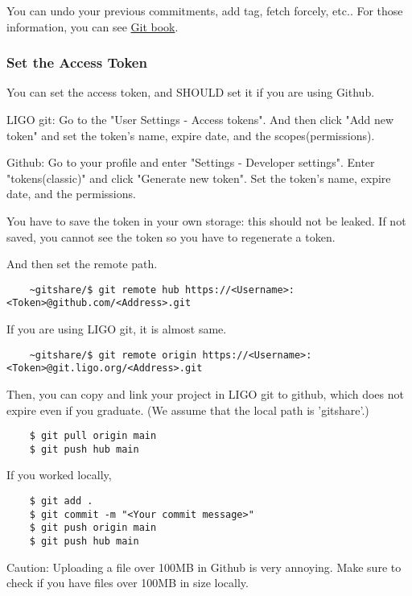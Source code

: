 You can undo your previous commitments, add tag, fetch forcely, etc.. For those information, you can see \href{https://git-scm.com/book/en/v2}{Git book}.

\subsubsection{Set the Access Token}

You can set the access token, and SHOULD set it if you are using Github.

LIGO git: Go to the "User Settings - Access tokens". And then click "Add new token" and set the token's name, expire date, and the scopes(permissions).

Github: Go to your profile and enter "Settings - Developer settings". Enter "tokens(classic)" and click "Generate new token". Set the token's name, expire date, and the permissions.

You have to save the token in your own storage: this should not be leaked. If not saved, you cannot see the token so you have to regenerate a token.

And then set the remote path.

\begin{verbatim}
    ~gitshare/$ git remote hub https://<Username>:<Token>@github.com/<Address>.git
\end{verbatim}

If you are using LIGO git, it is almost same.
\begin{verbatim}
    ~gitshare/$ git remote origin https://<Username>:<Token>@git.ligo.org/<Address>.git
\end{verbatim}

Then, you can copy and link your project in LIGO git to github, which does not expire even if you graduate. (We assume that the local path is 'gitshare'.)

\begin{verbatim}
    $ git pull origin main
    $ git push hub main
\end{verbatim}

If you worked locally,

\begin{verbatim}
    $ git add .
    $ git commit -m "<Your commit message>"
    $ git push origin main
    $ git push hub main
\end{verbatim}

Caution: Uploading a file over 100MB in Github is very annoying. Make sure to check if you have files over 100MB in size locally.

